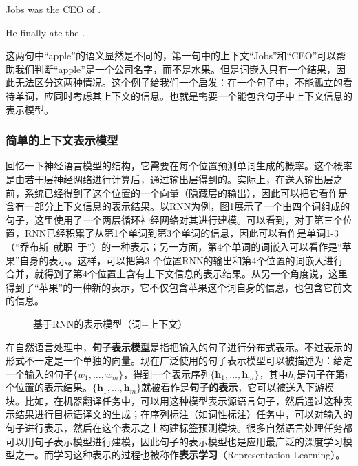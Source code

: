 \begin{example}
Jobs was the CEO of {}.

\qquad \qquad \; He finally ate the {}.
\end{example}

\parinterval  这两句中``apple''的语义显然是不同的，第一句中的上下文``Jobs''和``CEO''可以帮助我们判断``apple''是一个公司名字，而不是水果。但是词嵌入只有一个结果，因此无法区分这两种情况。这个例子给我们一个启发：在一个句子中，不能孤立的看待单词，应同时考虑其上下文的信息。也就是需要一个能包含句子中上下文信息的表示模型。


\subsubsection{简单的上下文表示模型}

\parinterval  回忆一下神经语言模型的结构，它需要在每个位置预测单词生成的概率。这个概率是由若干层神经网络进行计算后，通过输出层得到的。实际上，在送入输出层之前，系统已经得到了这个位置的一个向量（隐藏层的输出），因此可以把它看作是含有一部分上下文信息的表示结果。以RNN为例，图\ref{fig:5-68}展示了一个由四个词组成的句子，这里使用了一个两层循环神经网络对其进行建模。可以看到，对于第三个位置，RNN已经积累了从第1个单词到第3个单词的信息，因此可以看作是单词1-3（``乔布斯\ 就职\ 于''）的一种表示；另一方面，第4个单词的词嵌入可以看作是``苹果''自身的表示。这样，可以把第3 个位置RNN的输出和第4个位置的词嵌入进行合并，就得到了第4个位置上含有上下文信息的表示结果。从另一个角度说，这里得到了``苹果''的一种新的表示，它不仅包含苹果这个词自身的信息，也包含它前文的信息。

\begin{figure}[htp]
\centering

\caption{基于RNN的表示模型（词+上下文）}
\label{fig:5-68}
\end{figure}

\parinterval  在自然语言处理中，{\small\sffamily\bfseries{句子表示模型}}是指把输入的句子进行分布式表示。不过表示的形式不一定是一个单独的向量。现在广泛使用的句子表示模型可以被描述为：给定一个输入的句子$ \{ w_1,\dots ,w_m\} $，得到一个表示序列$ \{ \mathbf h_1,\dots ,\mathbf h_m\} $，其中$ h_i $是句子在第$ i $个位置的表示结果。$ \{ \mathbf h_1,\dots ,\mathbf h_m\} $就被看作是{\small\sffamily\bfseries{句子的表示}}，它可以被送入下游模块。比如，在机器翻译任务中，可以用这种模型表示源语言句子，然后通过这种表示结果进行目标语译文的生成；在序列标注（如词性标注）任务中，可以对输入的句子进行表示，然后在这个表示之上构建标签预测模块。很多自然语言处理任务都可以用句子表示模型进行建模，因此句子的表示模型也是应用最广泛的深度学习模型之一。而学习这种表示的过程也被称作{\small\sffamily\bfseries{表示学习}}（Representation Learning）。

